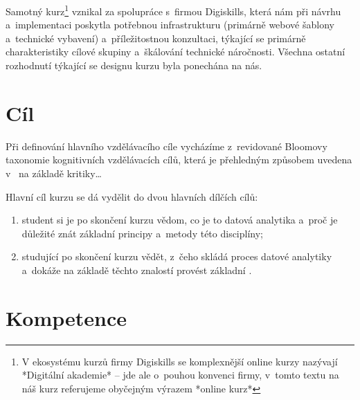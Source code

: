 Samotný kurz\footnote{V ekosystému kurzů firmy Digiskills se komplexnější online kurzy nazývají *Digitální akademie* – jde ale o~pouhou konvenci firmy, v~tomto textu na náš kurz referujeme obyčejným výrazem *online kurz*} vznikal za spolupráce s~firmou Digiskills, která nám při návrhu a~implementaci poskytla potřebnou infrastrukturu (primárně webové šablony a~technické vybavení) a~příležitostnou konzultaci, týkající se primárně charakteristiky cílové skupiny a~škálování technické náročnosti. Všechna ostatní rozhodnutí týkající se designu kurzu byla ponechána na nás.

\hypertarget{cuxedl}{%
\section{Cíl}\label{cuxedl}}

Při definování hlavního vzdělávacího cíle vycházíme z~revidované Bloomovy taxonomie kognitivních vzdělávacích cílů, která je přehledným způsobem uvedena v~\cite{vavra11} na základě kritiky\ldots{}

Hlavní cíl kurzu se dá vydělit do dvou hlavních dílčích cílů:

\begin{enumerate}
\def\labelenumi{\arabic{enumi}.}
\tightlist
\item
  student si je po skončení kurzu vědom, co je to datová analytika a~proč je důležité znát základní principy a~metody této disciplíny;
\item
  studující po skončení kurzu vědět, z~čeho skládá proces datové analytiky a~dokáže na základě těchto znalostí provést základní .
\end{enumerate}

\hypertarget{kompetence}{%
\section{Kompetence}\label{kompetence}}
